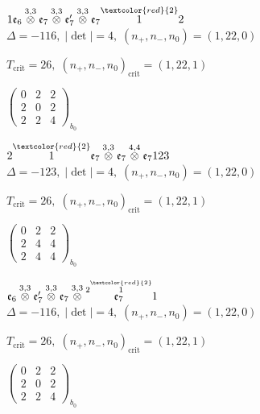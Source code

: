 \documentclass[10pt]{article}
\begin{document}
\smallskip

$1\mathfrak{e}_6\overset{3,3}{\otimes}\mathfrak{e}_7\overset{3,3}{\otimes}\mathfrak{e}_7'\overset{3,3}{\otimes}\mathfrak{e}_7\overset{\textcolor{red}{2}}{1}2$ \quad $\Delta=-116,\; |\det|=4,\; (n_+,n_-,n_0)=(1,22,0)$

\hspace{1em}$T_{\text{crit}}=26,\; (n_+,n_-,n_0)_{\text{crit}}=(1,22,1)$

\hspace{2em}$\left(\begin{smallmatrix}0 & 2 & 2 \\ 2 & 0 & 2 \\ 2 & 2 & 4\end{smallmatrix}\right)_{\!b_0}$

\smallskip

$2\overset{\textcolor{red}{2}}{1}\mathfrak{e}_7\overset{3,3}{\otimes}\mathfrak{e}_7\overset{4,4}{\otimes}\mathfrak{e}_7123$ \quad $\Delta=-123,\; |\det|=4,\; (n_+,n_-,n_0)=(1,22,0)$

\hspace{1em}$T_{\text{crit}}=26,\; (n_+,n_-,n_0)_{\text{crit}}=(1,22,1)$

\hspace{2em}$\left(\begin{smallmatrix}0 & 2 & 2 \\ 2 & 4 & 4 \\ 2 & 4 & 4\end{smallmatrix}\right)_{\!b_0}$

\smallskip

$\mathfrak{e}_6\overset{3,3}{\otimes}\mathfrak{e}_7'\overset{3,3}{\otimes}\mathfrak{e}_7\overset{3,3}{\otimes}\overset{2\overset{\textcolor{red}{2}}{1}}{\mathfrak{e}_7}1$ \quad $\Delta=-116,\; |\det|=4,\; (n_+,n_-,n_0)=(1,22,0)$

\hspace{1em}$T_{\text{crit}}=26,\; (n_+,n_-,n_0)_{\text{crit}}=(1,22,1)$

\hspace{2em}$\left(\begin{smallmatrix}0 & 2 & 2 \\ 2 & 0 & 2 \\ 2 & 2 & 4\end{smallmatrix}\right)_{\!b_0}$
\end{document}

